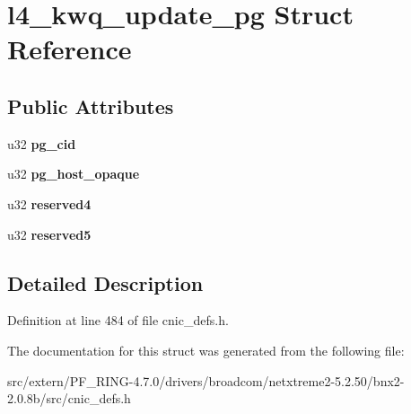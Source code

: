 \hypertarget{structl4__kwq__update__pg}{
\section{l4\_\-kwq\_\-update\_\-pg Struct Reference}
\label{structl4__kwq__update__pg}
}
\subsection*{Public Attributes}
\begin{DoxyCompactItemize}
\item 
\hypertarget{structl4__kwq__update__pg_aa0029b25589a659f9a57cb36067c063b}{
u32 {\bfseries pg\_\-cid}}
\label{structl4__kwq__update__pg_aa0029b25589a659f9a57cb36067c063b}

\item 
\hypertarget{structl4__kwq__update__pg_a1f297758019ce7b61e3834a6ebefa68b}{
u32 {\bfseries pg\_\-host\_\-opaque}}
\label{structl4__kwq__update__pg_a1f297758019ce7b61e3834a6ebefa68b}

\item 
\hypertarget{structl4__kwq__update__pg_a5f9b2b732274ce6f6a341c281004ac41}{
u32 {\bfseries reserved4}}
\label{structl4__kwq__update__pg_a5f9b2b732274ce6f6a341c281004ac41}

\item 
\hypertarget{structl4__kwq__update__pg_a68a1af3ef4318e0d738c1765e72db9a7}{
u32 {\bfseries reserved5}}
\label{structl4__kwq__update__pg_a68a1af3ef4318e0d738c1765e72db9a7}

\end{DoxyCompactItemize}


\subsection{Detailed Description}


Definition at line 484 of file cnic\_\-defs.h.



The documentation for this struct was generated from the following file:\begin{DoxyCompactItemize}
\item 
src/extern/PF\_\-RING-\/4.7.0/drivers/broadcom/netxtreme2-\/5.2.50/bnx2-\/2.0.8b/src/cnic\_\-defs.h\end{DoxyCompactItemize}

